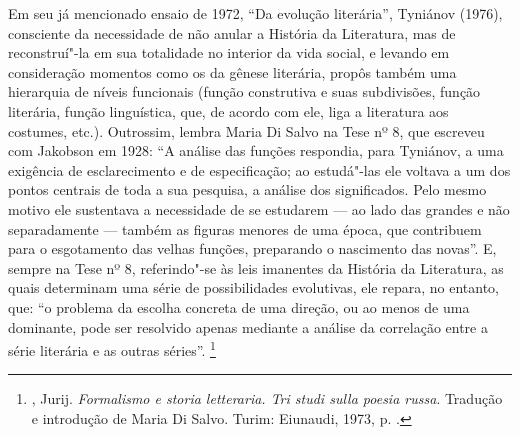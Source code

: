 {Em seu já mencionado ensaio de 1972, ``Da evolução literária'', Tyniánov (1976),
consciente da necessidade de não anular a História da
Literatura, mas de reconstruí"-la em sua totalidade no interior da vida
social, e levando em consideração momentos como os da gênese literária,
propôs também uma hierarquia de níveis funcionais (função construtiva e
suas subdivisões, função literária, função linguística, que, de acordo
com ele, liga a literatura aos costumes, etc.). Outrossim, lembra Maria Di
Salvo na Tese nº 8, que escreveu com Jakobson em 1928: ``A análise das funções respondia, para Tyniánov, a
uma exigência de esclarecimento e de especificação; ao estudá"-las ele
voltava a um dos pontos centrais de toda a sua pesquisa, a análise dos
significados. Pelo mesmo motivo ele sustentava a necessidade de se
estudarem --- ao lado das grandes e não separadamente --- também as figuras
menores de uma época, que contribuem para o esgotamento das velhas
funções, preparando o nascimento das novas''. E, sempre na Tese nº 8,
referindo"-se às leis imanentes da História da Literatura, as quais determinam
uma série de possibilidades evolutivas, ele repara, no entanto, que: ``o
problema da escolha concreta de uma direção, ou ao menos de uma
dominante, pode ser resolvido apenas mediante a análise da correlação
entre a série literária e as outras séries''.
\footnote{, Jurij. \emph{Formalismo e
 storia letteraria. Tri studi sulla poesia russa}. Tradução e introdução de Maria Di Salvo. Turim: Eiunaudi, 1973, p. .}

}
